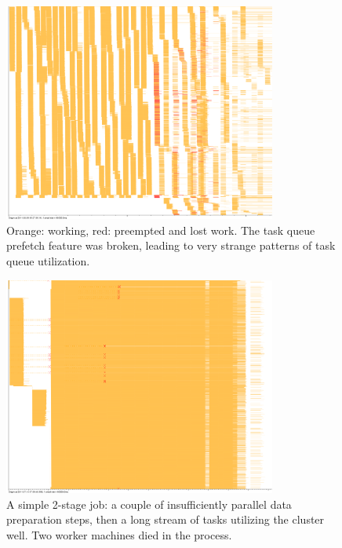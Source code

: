 \documentclass{article}
\begin{document}
\begin{figure}[p]
\center
\includegraphics[width=0.8\textwidth]{pics/splot/creepy-prefetch.png}
\caption{Orange: working, red: preempted and lost work. The task queue prefetch feature was broken, leading to very strange patterns of task queue utilization.}
\end{figure}

\begin{figure}[p]
\center
\includegraphics[width=0.8\textwidth]{pics/splot/simple-2stage-job.png}
\caption{A simple 2-stage job: a couple of insufficiently parallel data preparation steps, then a long stream of tasks utilizing the cluster well. Two worker machines died in the process.}
\end{figure}
\end{document}
